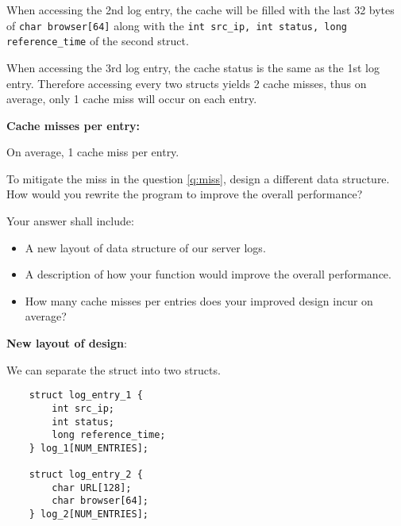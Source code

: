 \begin{questions}
{\begin{solution}
        When accessing the 2nd log entry, the cache will be filled with the last 32 bytes of \texttt{char browser[64]} along with the \texttt{int src\_ip, int status, long reference\_time} of the second struct. 

        When accessing the 3rd log entry, the cache status is the same as the 1st log entry. Therefore accessing every two structs yields 2 cache misses, thus on average, only 1 cache miss will occur on each entry.
        
        \textbf{Cache misses per entry:}
        
        On average, 1 cache miss per entry.
        

    \end{solution}
}

\newpage

\question[6] To mitigate the miss in the question \ref{q:miss},
design a different data structure. How would you rewrite the
program to improve the overall performance?

Your answer shall include:

\begin{itemize}
    \item A new layout of data structure of our server logs.
    \item A description of how your function would improve the
    overall performance.
    \item How many cache misses per entries does your improved
    design incur on average?
\end{itemize}

{
    \begin{solution}
        
        \textbf{New layout of design}:

        We can separate the struct into two structs. %

        \begin{verbatim}
    struct log_entry_1 {
        int src_ip;  
        int status; 
        long reference_time;
    } log_1[NUM_ENTRIES];

    struct log_entry_2 {
        char URL[128]; 
        char browser[64]; 
    } log_2[NUM_ENTRIES];


\end{verbatim}
\end{solution}}
\end{questions}
